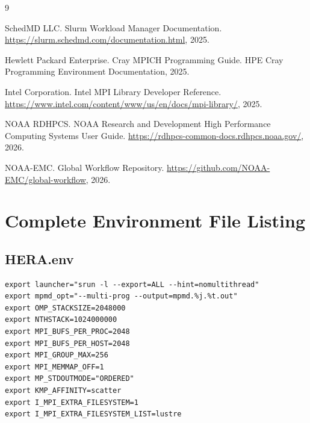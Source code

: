 \documentclass[11pt,a4paper,twoside]{article}
\begin{document}

\begin{thebibliography}{9}

SchedMD LLC.
\newblock Slurm Workload Manager Documentation.
\newblock \url{https://slurm.schedmd.com/documentation.html}, 2025.

Hewlett Packard Enterprise.
\newblock Cray MPICH Programming Guide.
\newblock HPE Cray Programming Environment Documentation, 2025.

Intel Corporation.
\newblock Intel MPI Library Developer Reference.
\newblock \url{https://www.intel.com/content/www/us/en/docs/mpi-library/}, 2025.

NOAA RDHPCS.
\newblock NOAA Research and Development High Performance Computing Systems User Guide.
\newblock \url{https://rdhpcs-common-docs.rdhpcs.noaa.gov/}, 2026.

NOAA-EMC.
\newblock Global Workflow Repository.
\newblock \url{https://github.com/NOAA-EMC/global-workflow}, 2026.

\end{thebibliography}

\appendix

\section{Complete Environment File Listing}
\label{app:envfiles}

\subsection{HERA.env}

\begin{lstlisting}[style=bashstyle]
export launcher="srun -l --export=ALL --hint=nomultithread"
export mpmd_opt="--multi-prog --output=mpmd.%j.%t.out"
export OMP_STACKSIZE=2048000
export NTHSTACK=1024000000
export MPI_BUFS_PER_PROC=2048
export MPI_BUFS_PER_HOST=2048
export MPI_GROUP_MAX=256
export MPI_MEMMAP_OFF=1
export MP_STDOUTMODE="ORDERED"
export KMP_AFFINITY=scatter
export I_MPI_EXTRA_FILESYSTEM=1
export I_MPI_EXTRA_FILESYSTEM_LIST=lustre
\end{lstlisting}
\end{document}
